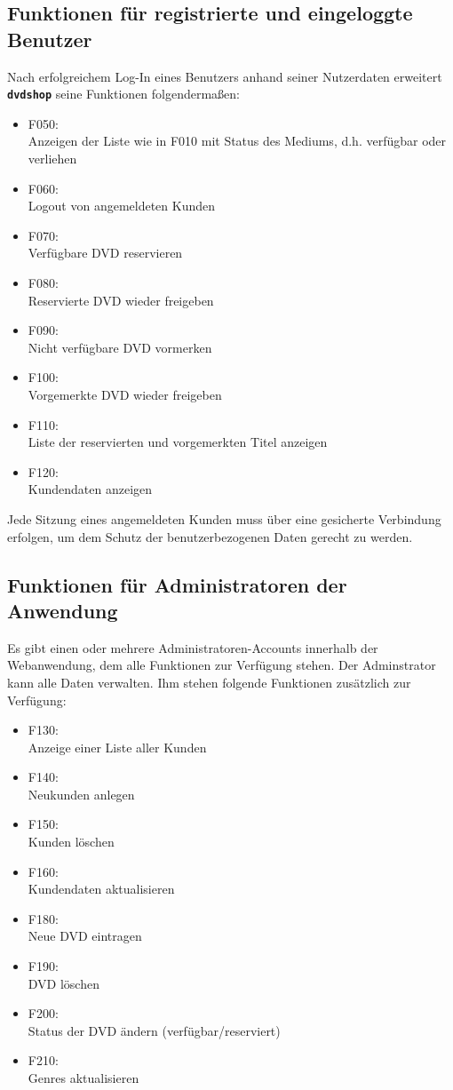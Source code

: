 \documentclass[12pt,oneside,a4paper,bibtotoc,liststotoc,pointlessnumbers]{scrartcl}
\begin{document}
\subsection{Funktionen für registrierte und eingeloggte Benutzer}
Nach erfolgreichem Log-In eines Benutzers anhand seiner Nutzerdaten erweitert \texttt{\textbf{dvdshop}} seine Funktionen folgendermaßen:
\begin{itemize}
\item F050: \\Anzeigen der Liste wie in F010 mit Status des Mediums, d.h. verfügbar oder verliehen
\item F060: \\Logout von angemeldeten Kunden
\item F070: \\Verfügbare DVD reservieren
\item F080: \\Reservierte DVD wieder freigeben
\item F090: \\Nicht verfügbare DVD vormerken
\item F100: \\Vorgemerkte DVD wieder freigeben
\item F110: \\Liste der reservierten und vorgemerkten Titel anzeigen
\item F120: \\Kundendaten anzeigen
\end{itemize}
Jede Sitzung eines angemeldeten Kunden muss über eine gesicherte Verbindung erfolgen, um dem Schutz der benutzerbezogenen Daten gerecht zu werden.
\subsection{Funktionen für Administratoren der Anwendung}
Es gibt einen oder mehrere Administratoren-Accounts innerhalb der Webanwendung, dem alle Funktionen zur Verfügung stehen. Der Adminstrator kann alle Daten verwalten. Ihm stehen folgende Funktionen zusätzlich zur Verfügung:
\begin{itemize}
\item F130: \\Anzeige einer Liste aller Kunden
\item F140: \\Neukunden anlegen
\item F150: \\Kunden löschen
\item F160: \\Kundendaten aktualisieren
\item F180: \\Neue DVD eintragen \newpage
\item F190: \\DVD löschen
\item F200: \\Status der DVD ändern (verfügbar/reserviert)
\item F210: \\Genres aktualisieren
\end{itemize}
\newpage
\end{document}
